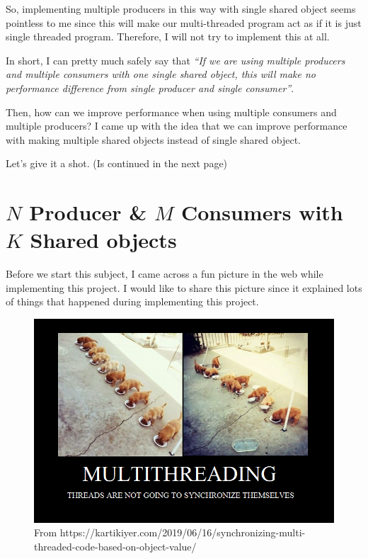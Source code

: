 \documentclass{homework}
\begin{document}
So, implementing multiple producers in this way with single shared object seems pointless to me since this will make our multi-threaded program act as if it is just single threaded program. Therefore, I will not try to implement this at all.
\par

In short, I can pretty much safely say that \textit{“If we are using multiple producers and multiple consumers with one single shared object, this will make no performance difference from single producer and single consumer”}. 
\par

Then, how can we improve performance when using multiple consumers and multiple producers? I came up with the idea that we can improve performance with making multiple shared objects instead of single shared object. 

Let’s give it a shot. (Is continued in the next page)
\pagebreak

\section{$N$ Producer \& $M$ Consumers with $K$ Shared objects} 
Before we start this subject, I came across a fun picture in the web while implementing this project. I would like to share this picture since it explained lots of things that happened during implementing this project. 
\par

\begin{center}
\begin{figure}[h]
    \centering
    \includegraphics{a8d72-multithreadingmeme.png}
    \caption{From https://kartikiyer.com/2019/06/16/synchronizing-multi-threaded-code-based-on-object-value/ }
    \label{fig:my_label}
\end{figure}
\end{center}
\end{document}
